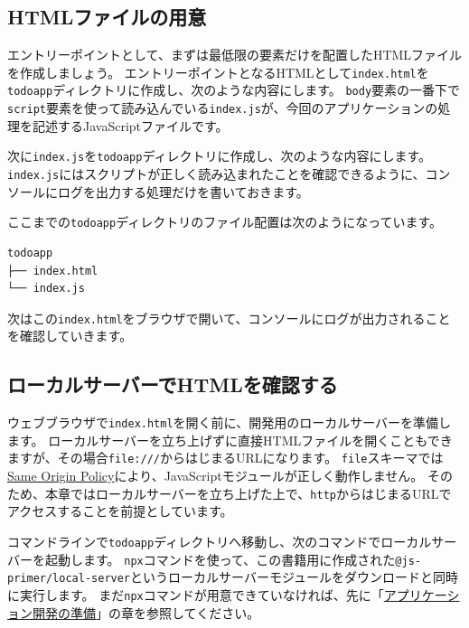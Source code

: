 \hypertarget{preparing-html}{%
\subsection{HTMLファイルの用意}\label{preparing-html}}

エントリーポイントとして、まずは最低限の要素だけを配置したHTMLファイルを作成しましょう。
エントリーポイントとなるHTMLとして\texttt{index.html}を\texttt{todoapp}ディレクトリに作成し、次のような内容にします。
\texttt{body}要素の一番下で\texttt{script}要素を使って読み込んでいる\texttt{index.js}が、今回のアプリケーションの処理を記述するJavaScriptファイルです。



次に\texttt{index.js}を\texttt{todoapp}ディレクトリに作成し、次のような内容にします。
\texttt{index.js}にはスクリプトが正しく読み込まれたことを確認できるように、コンソールにログを出力する処理だけを書いておきます。



ここまでの\texttt{todoapp}ディレクトリのファイル配置は次のようになっています。

\begin{lstlisting}
todoapp
├── index.html
└── index.js
\end{lstlisting}

次はこの\texttt{index.html}をブラウザで開いて、コンソールにログが出力されることを確認していきます。

\hypertarget{local-server}{%
\subsection{ローカルサーバーでHTMLを確認する}\label{local-server}}

ウェブブラウザで\texttt{index.html}を開く前に、開発用のローカルサーバーを準備します。
ローカルサーバーを立ち上げずに直接HTMLファイルを開くこともできますが、その場合\texttt{file:///}からはじまるURLになります。
\texttt{file}スキーマでは\href{https://developer.mozilla.org/ja/docs/Web/Security/Same-origin_policy}{Same
Origin Policy}により、JavaScriptモジュールが正しく動作しません。
そのため、本章ではローカルサーバーを立ち上げた上で、\texttt{http}からはじまるURLでアクセスすることを前提としています。

コマンドラインで\texttt{todoapp}ディレクトリへ移動し、次のコマンドでローカルサーバーを起動します。
\texttt{npx}コマンドを使って、この書籍用に作成された\texttt{@js-primer/local-server}というローカルサーバーモジュールをダウンロードと同時に実行します。
まだ\texttt{npx}コマンドが用意できていなければ、先に「\hyperlink{setup-local-env}{アプリケーション開発の準備}」の章を参照してください。

